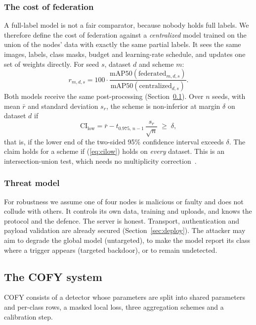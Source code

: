 \documentclass[pdflatex,sn-mathphys-num]{sn-jnl}
\newcommand{\sys}{COFY}
\begin{document}
\subsubsection{The cost of federation}
A full-label model is not a fair comparator, because nobody holds full labels. We therefore define the cost of federation against a \emph{centralized} model trained on the union of the nodes' data with exactly the same partial labels. It sees the same images, labels, class masks, budget and learning-rate schedule, and updates one set of weights directly. For seed $s$, dataset $d$ and scheme $m$:
\begin{equation}
r_{m,d,s} = 100\cdot\frac{\mathrm{mAP50}(\text{federated}_{m,d,s})}{\mathrm{mAP50}(\text{centralized}_{d,s})}.\label{eq:ratio}
\end{equation}
Both models receive the same post-processing (Section~\ref{sec:system}). Over $n$ seeds, with mean $\bar r$ and standard deviation $s_r$, the scheme is non-inferior at margin $\delta$ on dataset $d$ if
\begin{equation}
\mathrm{CI}_{\text{low}} = \bar r - t_{0.975,\,n-1}\,\frac{s_r}{\sqrt n}\;\ge\;\delta, \label{eq:cilow}
\end{equation}
that is, if the lower end of the two-sided 95\% confidence interval exceeds $\delta$. The claim holds for a scheme if (\ref{eq:cilow}) holds on \emph{every} dataset. This is an intersection-union test, which needs no multiplicity correction~\cite{berger1996iut}.

\subsubsection{Threat model}\label{sec:threat}
For robustness we assume one of four nodes is malicious or faulty and does not collude with others. It controls its own data, training and uploads, and knows the protocol and the defence. The server is honest. Transport, authentication and payload validation are already secured (Section~\ref{sec:deploy}). The attacker may aim to degrade the global model (untargeted), to make the model report its class where a trigger appears (targeted backdoor), or to remain undetected.

\subsection{The \sys{} system}\label{sec:system}
\sys{} consists of a detector whose parameters are split into shared parameters and per-class rows, a masked local loss, three aggregation schemes and a calibration step.
\end{document}
